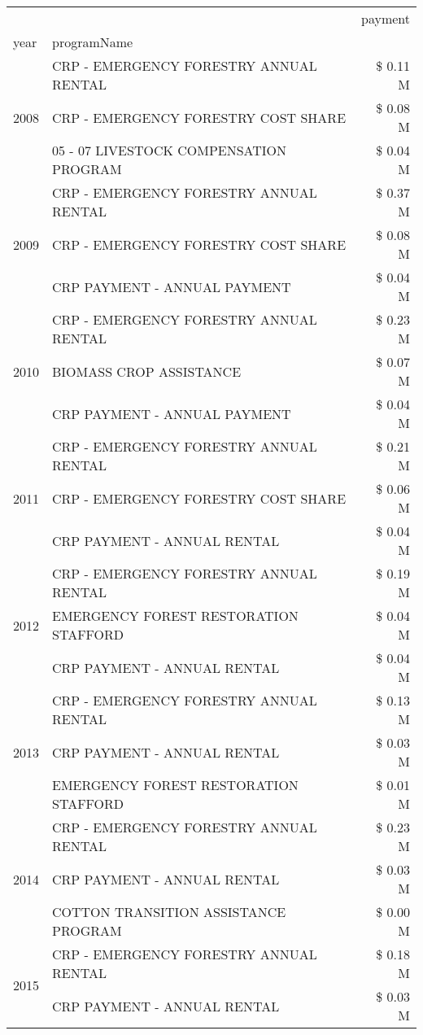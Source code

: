 \begin{tabular}{llr}
\toprule
 &  & payment \\
year & programName &  \\
\midrule
\multirow[t]{3}{*}{2008} & CRP - EMERGENCY FORESTRY ANNUAL RENTAL & \$ 0.11 M \\
 & CRP - EMERGENCY FORESTRY COST SHARE & \$ 0.08 M \\
 & 05 - 07 LIVESTOCK COMPENSATION PROGRAM & \$ 0.04 M \\
\cline{1-3}
\multirow[t]{3}{*}{2009} & CRP - EMERGENCY FORESTRY ANNUAL RENTAL & \$ 0.37 M \\
 & CRP - EMERGENCY FORESTRY COST SHARE & \$ 0.08 M \\
 & CRP PAYMENT - ANNUAL PAYMENT & \$ 0.04 M \\
\cline{1-3}
\multirow[t]{3}{*}{2010} & CRP - EMERGENCY FORESTRY ANNUAL RENTAL & \$ 0.23 M \\
 & BIOMASS CROP ASSISTANCE & \$ 0.07 M \\
 & CRP PAYMENT - ANNUAL PAYMENT & \$ 0.04 M \\
\cline{1-3}
\multirow[t]{3}{*}{2011} & CRP - EMERGENCY FORESTRY ANNUAL RENTAL & \$ 0.21 M \\
 & CRP - EMERGENCY FORESTRY COST SHARE & \$ 0.06 M \\
 & CRP PAYMENT - ANNUAL RENTAL & \$ 0.04 M \\
\cline{1-3}
\multirow[t]{3}{*}{2012} & CRP - EMERGENCY FORESTRY ANNUAL RENTAL & \$ 0.19 M \\
 & EMERGENCY FOREST RESTORATION STAFFORD & \$ 0.04 M \\
 & CRP PAYMENT - ANNUAL RENTAL & \$ 0.04 M \\
\cline{1-3}
\multirow[t]{3}{*}{2013} & CRP - EMERGENCY FORESTRY ANNUAL RENTAL & \$ 0.13 M \\
 & CRP PAYMENT - ANNUAL RENTAL & \$ 0.03 M \\
 & EMERGENCY FOREST RESTORATION STAFFORD & \$ 0.01 M \\
\cline{1-3}
\multirow[t]{3}{*}{2014} & CRP - EMERGENCY FORESTRY ANNUAL RENTAL & \$ 0.23 M \\
 & CRP PAYMENT - ANNUAL RENTAL & \$ 0.03 M \\
 & COTTON TRANSITION ASSISTANCE PROGRAM & \$ 0.00 M \\
\cline{1-3}
\multirow[t]{3}{*}{2015} & CRP - EMERGENCY FORESTRY ANNUAL RENTAL & \$ 0.18 M \\
 & CRP PAYMENT - ANNUAL RENTAL & \$ 0.03 M \\

\end{tabular}
